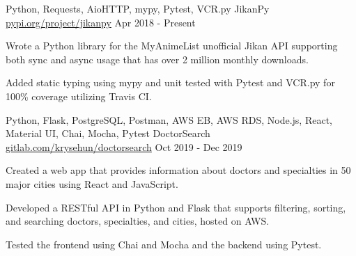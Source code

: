 

\begin{cventries}

  \cventry
  {Python, Requests, AioHTTP, mypy, Pytest, VCR.py} %
  {JikanPy} %
  {\href{https://pypi.org/project/jikanpy/}{pypi.org/project/jikanpy}} %
  {Apr 2018 - Present} %
  {
    \begin{cvitems} %
      \item {Wrote a Python library for the MyAnimeList unofficial Jikan API supporting both sync and async usage that has over 2 million monthly downloads.}
      \item {Added static typing using mypy and unit tested with Pytest and VCR.py for 100\% coverage utilizing Travis CI.}
    \end{cvitems}
  }

  \cventry
  {Python, Flask, PostgreSQL, Postman, AWS EB, AWS RDS, Node.js, React, Material UI, Chai, Mocha, Pytest} %
  {DoctorSearch} %
  {\href{https://gitlab.com/krysehun/doctorsearch}{gitlab.com/krysehun/doctorsearch}} %
  {Oct 2019 - Dec 2019} %
  {
    \begin{cvitems} %
      \item {Created a web app that provides information about doctors and specialties in 50 major cities using React and JavaScript.}
      \item {Developed a RESTful API in Python and Flask that supports filtering, sorting, and searching doctors, specialties, and cities, hosted on AWS.}
      \item {Tested the frontend using Chai and Mocha and the backend using Pytest.}
    \end{cvitems}
  }

\end{cventries}

